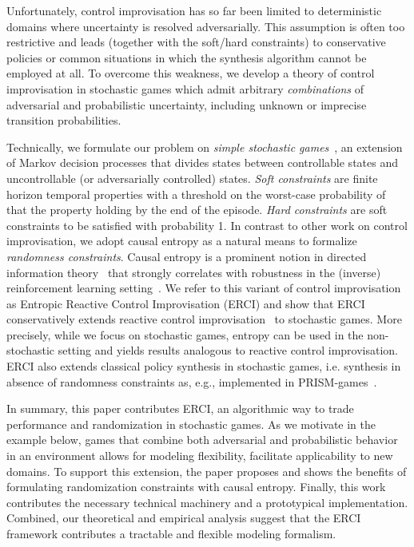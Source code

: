 Unfortunately, control improvisation has so far been limited to
deterministic domains where uncertainty is resolved
adversarially. This assumption is often too restrictive and leads
(together with the soft/hard constraints) to conservative policies or
common situations in which the synthesis algorithm cannot be employed
at all. To overcome this weakness, we develop a theory of control
improvisation in stochastic games which admit
arbitrary \emph{combinations} of adversarial and probabilistic
uncertainty, including unknown or imprecise transition
probabilities. 

Technically, we formulate our problem on \emph{simple stochastic
games}~\cite{DBLP:conf/dimacs/Condon90}, an extension of Markov decision processes that divides states
between controllable states and uncontrollable (or adversarially
controlled) states. \emph{Soft constraints} are finite horizon
temporal properties with a threshold on the worst-case probability of
that the property holding by the end of the episode. \emph{Hard
constraints} are soft constraints to be satisfied with probability 1. In
contrast to other work on control improvisation, we adopt causal entropy as a natural means to formalize \emph{randomness
constraints}.  Causal entropy is a prominent notion in directed
information theory~\cite{DirectedInfoTheoery} that strongly correlates with robustness in the
(inverse) reinforcement learning setting~\cite{mceThesis,
maxEntAnswer}. We refer to this variant of control improvisation as
Entropic Reactive Control Improvisation (ERCI) and show that ERCI
conservatively extends reactive control improvisation~\cite{DBLP:conf/cav/FremontS18} to stochastic
games. More precisely, while we focus on stochastic games, entropy can
be used in the non-stochastic setting and yields results analogous to
reactive control improvisation. ERCI also extends  classical policy synthesis in stochastic games, i.e. synthesis in absence of randomness constraints as, e.g., implemented in PRISM-games~\cite{DBLP:journals/sttt/KwiatkowskaPW18}.


%
In summary, this paper contributes ERCI, an algorithmic way to trade
performance and randomization in stochastic games. As we motivate in
the example below, games that combine both adversarial and
probabilistic behavior in an environment allows for modeling
flexibility, facilitate applicability to new domains. To support this
extension, the paper proposes and shows the benefits of formulating
randomization constraints with causal entropy.  Finally, this work
contributes the necessary technical machinery and a prototypical
implementation. Combined, our theoretical and empirical analysis
suggest that the ERCI framework contributes a tractable and flexible
modeling formalism.

